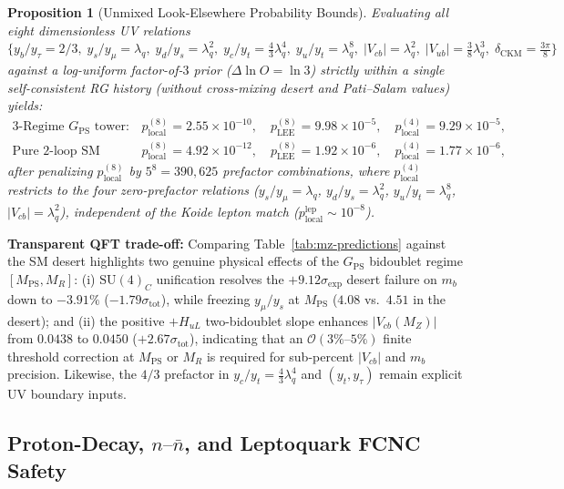 \documentclass[11pt,a4paper]{article}
\newtheorem{proposition}[theorem]{Proposition}
\begin{document}
\begin{proposition}[Unmixed Look-Elsewhere Probability Bounds]
\label{prop:lee}
Evaluating all eight dimensionless UV relations $\{y_b/y_\tau = 2/3,\; y_s/y_\mu = \lambda_q,\; y_d/y_s = \lambda_q^2,\; y_c/y_t = \frac{4}{3}\lambda_q^4,\; y_u/y_t = \lambda_q^8,\; |V_{cb}| = \lambda_q^2,\; |V_{ub}| = \frac{3}{8}\lambda_q^3,\; \delta_{\mathrm{CKM}} = \frac{3\pi}{8}\}$ against a log-uniform factor-of-$3$ prior ($\Delta\ln O = \ln 3$) \emph{strictly within a single self-consistent RG history} (without cross-mixing desert and Pati--Salam values) yields:
\begin{align}
\text{3-Regime $G_{\mathrm{PS}}$ tower:}\quad & p_{\mathrm{local}}^{(8)} = 2.55\times 10^{-10}, \quad p_{\mathrm{LEE}}^{(8)} = 9.98\times 10^{-5}, \quad p_{\mathrm{local}}^{(4)} = 9.29\times 10^{-5}, \label{eq:p-lee-ps}\\
\text{Pure 2-loop SM desert:}\quad & p_{\mathrm{local}}^{(8)} = 4.92\times 10^{-12}, \quad p_{\mathrm{LEE}}^{(8)} = 1.92\times 10^{-6}, \quad p_{\mathrm{local}}^{(4)} = 1.77\times 10^{-6}, \label{eq:p-lee-des}
\end{align}
after penalizing $p_{\mathrm{local}}^{(8)}$ by $5^8 = 390{,}625$ prefactor combinations, where $p_{\mathrm{local}}^{(4)}$ restricts to the four zero-prefactor relations ($y_s/y_\mu = \lambda_q$, $y_d/y_s = \lambda_q^2$, $y_u/y_t = \lambda_q^8$, $|V_{cb}| = \lambda_q^2$), independent of the Koide lepton match ($p_{\mathrm{local}}^{\mathrm{lep}} \sim 10^{-8}$).
\end{proposition}

\noindent\textbf{Transparent QFT trade-off:} Comparing Table~\ref{tab:mz-predictions} against the SM desert highlights two genuine physical effects of the $G_{\mathrm{PS}}$ bidoublet regime $[M_{\mathrm{PS}}, M_R]$: (i) $\mathrm{SU}(4)_C$ unification resolves the $+9.12\sigma_{\mathrm{exp}}$ desert failure on $m_b$ down to $-3.91\%$ ($-1.79\sigma_{\mathrm{tot}}$), while freezing $y_\mu/y_s$ at $M_{\mathrm{PS}}$ ($4.08$ vs.\ $4.51$ in the desert); and (ii) the positive $+H_{uL}$ two-bidoublet slope enhances $|V_{cb}(M_Z)|$ from $0.0438$ to $0.0450$ ($+2.67\sigma_{\mathrm{tot}}$), indicating that an $\mathcal{O}(3\%\text{--}5\%)$ finite threshold correction at $M_{\mathrm{PS}}$ or $M_R$ is required for sub-percent $|V_{cb}|$ and $m_b$ precision. Likewise, the $4/3$ prefactor in $y_c/y_t = \frac{4}{3}\lambda_q^4$ and $(y_t, y_\tau)$ remain explicit UV boundary inputs.

\subsection{Proton-Decay, \texorpdfstring{$n\text{--}\bar{n}$}{n-nbar}, and Leptoquark FCNC Safety}
\label{subsec:proton-decay}
\end{document}
